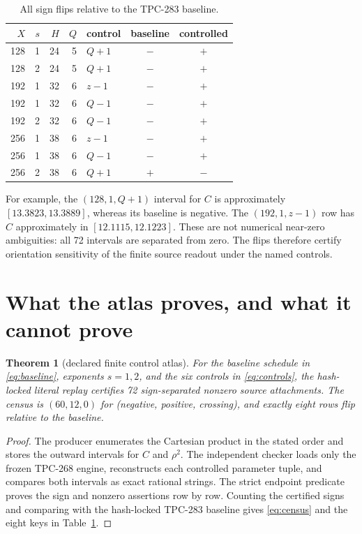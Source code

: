 \documentclass[11pt]{article}
\newtheorem{theorem}{Theorem}
\begin{document}
\begin{table}[t]
\centering
\small
\caption{All sign flips relative to the TPC-283 baseline.}
\label{tab:flips}
\begin{tabular}{rrrrlcc}
\toprule
$X$&$s$&$H$&$Q$&control&baseline&controlled\\
\midrule
128&1&24&5&$Q+1$&$-$&$+$\\
128&2&24&5&$Q+1$&$-$&$+$\\
192&1&32&6&$z-1$&$-$&$+$\\
192&1&32&6&$Q-1$&$-$&$+$\\
192&2&32&6&$Q-1$&$-$&$+$\\
256&1&38&6&$z-1$&$-$&$+$\\
256&1&38&6&$Q-1$&$-$&$+$\\
256&2&38&6&$Q+1$&$+$&$-$\\
\bottomrule
\end{tabular}
\end{table}

For example, the $(128,1,Q+1)$ interval for $C$ is approximately
$[13.3823,13.3889]$, whereas its baseline is negative.  The $(192,1,z-1)$
row has $C$ approximately in $[12.1115,12.1223]$.  These are not numerical
near-zero ambiguities: all 72 intervals are separated from zero.  The flips
therefore certify orientation sensitivity of the finite source readout under
the named controls.

\section{What the atlas proves, and what it cannot prove}

\begin{theorem}[declared finite control atlas]
For the baseline schedule in \eqref{eq:baseline}, exponents $s=1,2$, and the
six controls in \eqref{eq:controls}, the hash-locked literal replay certifies
72 sign-separated nonzero source attachments.  The census is
$(60,12,0)$ for (negative, positive, crossing), and exactly eight rows flip
relative to the baseline.
\end{theorem}

\begin{proof}
The producer enumerates the Cartesian product in the stated order and stores
the outward intervals for $C$ and $\rho^2$.  The independent checker loads
only the frozen TPC-268 engine, reconstructs each controlled parameter tuple,
and compares both intervals as exact rational strings.  The strict endpoint
predicate proves the sign and nonzero assertions row by row.  Counting the
certified signs and comparing with the hash-locked TPC-283 baseline gives
\eqref{eq:census} and the eight keys in Table~\ref{tab:flips}.
\end{proof}
\end{document}
